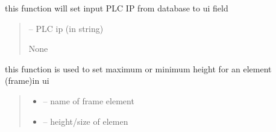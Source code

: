 \documentclass[letterpaper,10pt,english]{sphinxmanual}
\begin{document}
\begin{savenotes}
\begin{fulllineitems}

\begin{savenotes}\begin{fulllineitems}
\label{\detokenize{setting/setting_UI:oxin.setting_UI.UI_main_window.set_plc_ip}}
\pysigstartsignatures
{}
\pysigstopsignatures
\sphinxAtStartPar
this function will set input PLC IP from database to ui field
\begin{quote}\begin{description}
\sphinxAtStartPar
{} – PLC ip (in string)

\sphinxAtStartPar
None

\end{description}\end{quote}

\end{fulllineitems}\end{savenotes}


\begin{savenotes}\begin{fulllineitems}
\label{\detokenize{setting/setting_UI:oxin.setting_UI.UI_main_window.set_size}}
\pysigstartsignatures
{}
\pysigstopsignatures
\sphinxAtStartPar
this function is used to set maximum or minimum height for an element (frame)in ui
\begin{quote}\begin{description}
\begin{itemize}
\item {} 
\sphinxAtStartPar
{} – name of frame element

\item {} 
\sphinxAtStartPar
{} – height/size of elemen


\end{itemize}
\end{description}
\end{quote}
\end{fulllineitems}
\end{savenotes}
\end{fulllineitems}
\end{savenotes}
\end{document}
